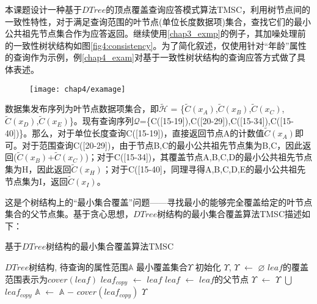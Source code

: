 本课题设计一种基于$DTree$的顶点覆盖查询应答模式算法TMSC，利用树节点间的一致性特性，对于满足查询范围的叶节点(单位长度数据项)集合，查找它们的最小公共祖先节点集合作为应答返回。继续使用\ref{chap3_exmp}的例子，其加噪处理前的一致性树状结构如图\ref{fig4:consistency}。为了简化叙述，仅使用针对“年龄”属性的查询作为示例，例\ref{chap4_exam}对基于一致性树状结构的查询应答方式做了具体表述。

\begin{figure}[!htp]
	\centering
	\texttt{[image: chap4/examage]}
\end{figure}

\begin{exmp}
\label{chap4_exam}
数据集发布序列为叶节点数据项集合，即$\tilde{\mathcal{H}}$ = \{$\tilde{C}(x_{A})$,$\tilde{C}(x_{B})$,$\tilde{C}(x_{C})$,$\tilde{C}(x_{D})$,$\tilde{C}(x_{E})$\}。现有查询序列$\mathcal{Q}$=\{C([15-19]),C([20-29]),C([15-34]),C([15-40])\}。那么，对于单位长度查询C([15-19])，直接返回节点A的计数值$\tilde{C}(x_{A})$即可。对于范围查询C([20-29])，由于节点B,C的最小公共祖先节点集为{B,C}，因此返回($\tilde{C}(x_{B})$+$\tilde{C}(x_{C})$)；对于C([15-34])，其覆盖节点A,B,C,D的最小公共祖先节点集为{H}，因此返回$\tilde{C}(x_{H})$；对于C([15-40]，同理寻得A,B,C,D,E的最小公共祖先节点集为{I}，返回$\tilde{C}(x_{I})$。
\end{exmp}

这是个树结构上的“最小集合覆盖”问题——寻找最小的能够完全覆盖给定的叶节点集合的父节点集。基于贪心思想，$DTree$树结构的最小集合覆盖算法TMSC描述如下：

\begin{algorithm}[H]
	\caption{基于$DTree$树结构的最小集合覆盖算法TMSC}
	\label{msc}
	\begin{algorithmic}[1]
		\REQUIRE $DTree$树结构, 待查询的属性范围$\mathbb{A}$
		\ENSURE 最小覆盖集合$\Upsilon$
		初始化 $\Upsilon$, $\Upsilon$ $\leftarrow$ $\varnothing$
		\STATE $leaf$的覆盖范围表示为$cover(leaf)$
		\STATE $leaf_{copy}$ $\leftarrow$ $leaf$
		\STATE $leaf$ $\leftarrow$ $leaf$的父节点
		\ENDWHILE 
		\STATE $\Upsilon$ $\leftarrow$ $\Upsilon$ $\bigcup$ $leaf_{copy}$
		\STATE $\mathbb{A}$ $\leftarrow$ $\mathbb{A}$ $-$ $cover(leaf_{copy})$
		\RETURN $\Upsilon$
		\ENDIF
		\ENDFOR
	\end{algorithmic}
\end{algorithm}

